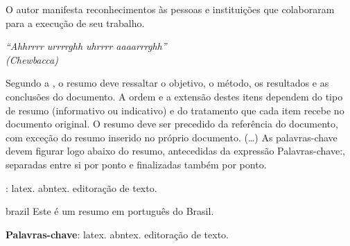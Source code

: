\documentclass[
	12pt,				%
	openright,			%
	oneside,			%
	a4paper,			%
	sumario=tradicional,%
	french,				%
	spanish,			%
	brazil,				%
    english
	]{abntex2}
\begin{document}
\begin{agradecimentos}
O autor manifesta reconhecimentos às pessoas e instituições que colaboraram para a execução de seu trabalho.

\end{agradecimentos}

\begin{epigrafe}
    \vspace*{\fill}
	\begin{flushright}
		\textit{``Ahhrrrr urrrrghh uhrrrr aaaarrrghh''\\
		(Chewbacca)}
	\end{flushright}
\end{epigrafe}


\setlength{\absparsep}{18pt} %
\begin{resumo}
 Segundo a , o resumo deve ressaltar o
 objetivo, o método, os resultados e as conclusões do documento. A ordem e a extensão
 destes itens dependem do tipo de resumo (informativo ou indicativo) e do
 tratamento que cada item recebe no documento original. O resumo deve ser
 precedido da referência do documento, com exceção do resumo inserido no
 próprio documento. (\ldots) As palavras-chave devem figurar logo abaixo do
 resumo, antecedidas da expressão Palavras-chave:, separadas entre si por
 ponto e finalizadas também por ponto.

 \textbf{\palavrasChave}: latex. abntex. editoração de texto.
\end{resumo}

%

\begin{resumo}[Resumo]
 \begin{otherlanguage*}{brazil}
    Este é um resumo em português do Brasil.

   \textbf{Palavras-chave}: latex. abntex. editoração de texto.
 \end{otherlanguage*}
\end{resumo}
\end{document}
